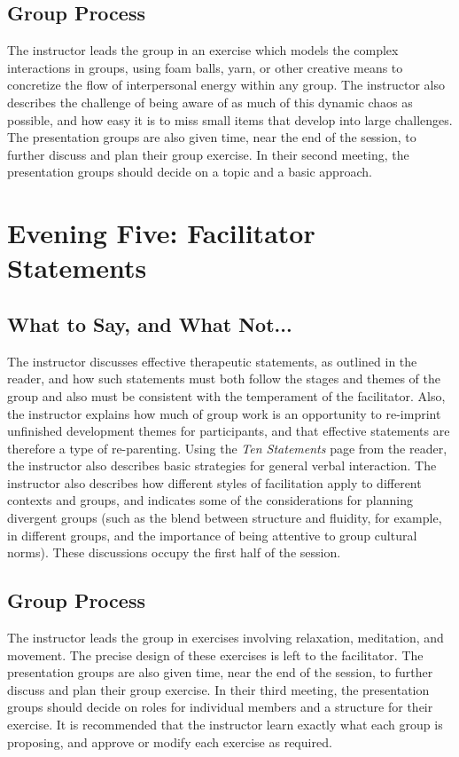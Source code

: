 \documentclass[12pt,DIV7,oneside,tocindent,headsepline]{scrbook}
\begin{document}
\subsection{Group Process}  The instructor leads the group in an exercise which models the complex interactions in groups, using foam balls, yarn, or other creative means to concretize the flow of interpersonal energy within any group. The instructor also describes the challenge of being aware of as much of this dynamic chaos as possible, and how easy it is to miss small items that develop into large challenges.  The presentation groups are also given time, near the end of the session, to further discuss and plan their group exercise. In their second meeting, the presentation groups should decide on a topic and a basic approach. 

\section{Evening Five: Facilitator Statements}  
\subsection{What to Say, and What Not...}
The instructor discusses effective therapeutic statements, as outlined in the reader, and how such statements must both follow the stages and themes of the group and also must be consistent with the temperament of the facilitator. Also, the instructor explains how much of group work is an opportunity to re-imprint unfinished development themes for participants, and that effective statements are therefore a type of re-parenting.  Using the \textit{Ten Statements} page from the reader, the instructor also describes basic strategies for general verbal interaction.  The instructor also describes how different styles of facilitation apply to different contexts and groups, and indicates some of the considerations for planning divergent groups (such as the blend between structure and fluidity, for example, in different groups, and the importance of being attentive to group cultural norms).  These discussions occupy the first half of the session. 

\subsection{Group Process}  
The instructor leads the group in exercises involving relaxation, meditation, and movement. The precise design of these exercises is left to the facilitator.  The presentation groups are also given time, near the end of the session, to further discuss and plan their group exercise. In their third meeting, the presentation groups should decide on roles for individual members and a structure for their exercise. It is recommended that the instructor learn exactly what each group is proposing, and approve or modify each exercise as required. 
\end{document}
